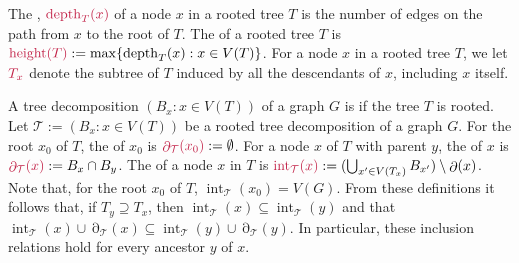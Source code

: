\documentclass{patmorin}
\DeclareMathOperator{\depth}{depth}
\DeclareMathOperator{\height}{height}
\DeclareMathOperator{\interior}{int}
\DeclareMathOperator{\boundary}{\partial}
\begin{document}
The , $\mathdefin{\depth_T(x)}$ of a node $x$ in a rooted tree $T$ is the number of edges on the path from $x$ to the root of $T$. The  of a rooted tree $T$ is $\mathdefin{\height(T)}:=\max\{\depth_T(x):x\in V(T)\}$. For a node $x$ in a rooted tree $T$, we let $\mathdefin{T_x}$ denote the subtree of $T$ induced by all the descendants of $x$, including $x$ itself.
 
A tree decomposition $(B_x:x\in V(T))$ of a graph $G$ is  if the tree $T$ is rooted.  Let $\mathcal{T}:=(B_x:x\in V(T))$ be a rooted tree decomposition of a graph $G$.    For the root $x_0$ of $T$, the  of $x_0$ is $\mathdefin{\boundary_{\mathcal{T}}(x_0)}:=\emptyset$.  For a node $x$ of $T$ with parent $y$, the  of $x$ is $\mathdefin{\boundary_\mathcal{T}(x)}:=B_x\cap B_y$.  The  of a node $x$ in $T$ is $\mathdefin{\interior_\mathcal{T}(x)}:=(\bigcup_{x'\in V(T_x)} B_{x'})\setminus \boundary(x)$.  Note that, for the root $x_0$ of $T$, $\interior_{\mathcal{T}}(x_0)=V(G)$.  From these definitions it follows that, if $T_y\supseteq T_x$, then $\interior_{\mathcal{T}}(x)\subseteq\interior_{\mathcal{T}}(y)$ and that $\interior_\mathcal{T}(x) \cup \boundary_\mathcal{T}(x)\subseteq \interior_\mathcal{T}(y) \cup \boundary_\mathcal{T}(y)$. In particular, these inclusion relations hold for every ancestor $y$ of $x$. 



\end{document}
